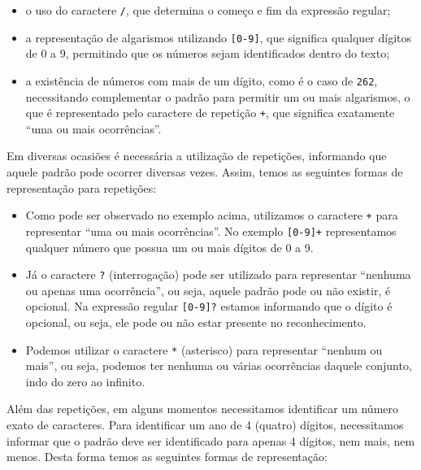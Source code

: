 \begin{itemize}

    \item o uso do caractere \texttt{/}, que determina o começo e fim da expressão regular;
    
    \item a representação de algarismos utilizando \texttt{[0-9]}, que significa qualquer dígitos de 0 a 9, permitindo que os números sejam identificados dentro do texto; 
    
    \item a existência de números com mais de um dígito, como é o caso de \texttt{262}, necessitando complementar o padrão para permitir um ou mais algarismos, o que é representado pelo caractere de repetição \texttt{+}, que significa exatamente ``uma ou mais ocorrências''.

\end{itemize}

Em diversas ocasiões é necessária a utilização de repetições, informando que aquele padrão pode ocorrer diversas vezes. Assim, temos as seguintes formas de representação para repetições:

\begin{itemize}

    \item Como pode ser observado no exemplo acima, utilizamos o caractere \texttt{+} para representar ``uma ou mais ocorrências''. No exemplo \texttt{[0-9]+} representamos qualquer número que possua um ou mais dígitos de 0 a 9.
    
    \item Já o caractere \texttt{?} (interrogação) pode ser utilizado para representar ``nenhuma ou apenas uma ocorrência'', ou seja, aquele padrão pode ou não existir, é opcional. Na expressão regular \texttt{[0-9]?} estamos informando que o dígito é opcional, ou seja, ele pode ou não estar presente no reconhecimento.
    
    \item Podemos utilizar o caractere \texttt{*} (asterisco) para representar ``nenhum ou mais'', ou seja, podemos ter nenhuma ou várias ocorrências daquele conjunto, indo do zero ao infinito.

\end{itemize}

Além das repetições, em alguns momentos necessitamos identificar um número exato de caracteres. Para identificar um ano de 4 (quatro) dígitos, necessitamos informar que o padrão deve ser identificado para apenas 4 dígitos, nem mais, nem menos. Desta forma temos as seguintes formas de representação:


